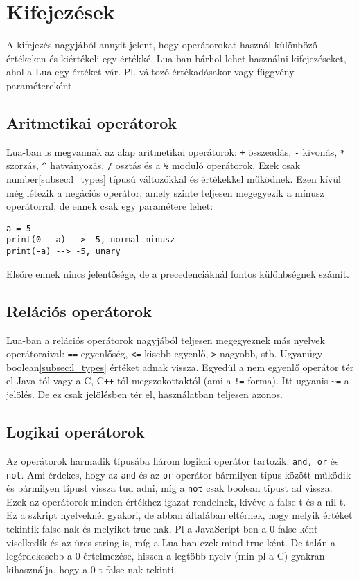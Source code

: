 \section{Kifejezések}
\label{sec:l_expr}

A kifejezés nagyjából annyit jelent, hogy operátorokat használ különböző értékeken és kiértékeli egy értékké. Lua-ban bárhol lehet használni kifejezéseket, ahol a Lua egy értéket vár. Pl. változó értékadásakor vagy függvény paramétereként.

\subsection{Aritmetikai operátorok}

Lua-ban is megvannak az alap aritmetikai operátorok: \verb|+| összeadás, \verb|-| kivonás, \verb|*| szorzás, \verb|^| hatványozás, \verb|/| osztás és a \verb|%| moduló operátorok. Ezek csak number\ref{subsec:l_types} típusú változókkal és értékekkel működnek. Ezen kívül még létezik a negációs operátor, amely szinte teljesen megegyezik a mínusz operátorral, de ennek csak egy paramétere lehet:
\scriptsize
\begin{lstlisting}
a = 5
print(0 - a) --> -5, normal minusz
print(-a) --> -5, unary
\end{lstlisting}
\normalsize
Elsőre ennek nincs jelentősége, de a precedenciáknál fontos különbségnek számít.

\subsection{Relációs operátorok}

Lua-ban a relációs operátorok nagyjából teljesen megegyeznek más nyelvek operátoraival: \verb|==| egyenlőség, \verb|<=| kisebb-egyenlő, \verb|>| nagyobb, stb. Ugyanúgy boolean\ref{subsec:l_types} értéket adnak vissza. Egyedül a nem egyenlő operátor tér el Java-tól vagy a C, C\verb|++|-tól megszokottaktól (ami a \verb|!=| forma). Itt ugyanis \verb|~=| a jelölés. De ez csak jelölésben tér el, használatban teljesen azonos.

\subsection{Logikai operátorok}

Az operátorok harmadik típusába három logikai operátor tartozik: \verb|and, or| és \verb|not|. Ami érdekes, hogy az \verb|and| és az \verb|or| operátor bármilyen típus között működik és bármilyen típust vissza tud adni, míg a \verb|not| csak boolean típust ad vissza. Ezek az operátorok minden értékhez igazat rendelnek, kivéve a false-t és a nil-t. Ez a szkript nyelveknél gyakori, de abban általában eltérnek, hogy melyik értéket tekintik false-nak és melyiket true-nak. Pl a JavaScript-ben a 0 false-ként viselkedik és az üres string is, míg a Lua-ban ezek mind true-ként. De talán a legérdekesebb a 0 értelmezése, hiszen a legtöbb nyelv (min pl a C) gyakran kihasználja, hogy a 0-t false-nak tekinti. 

